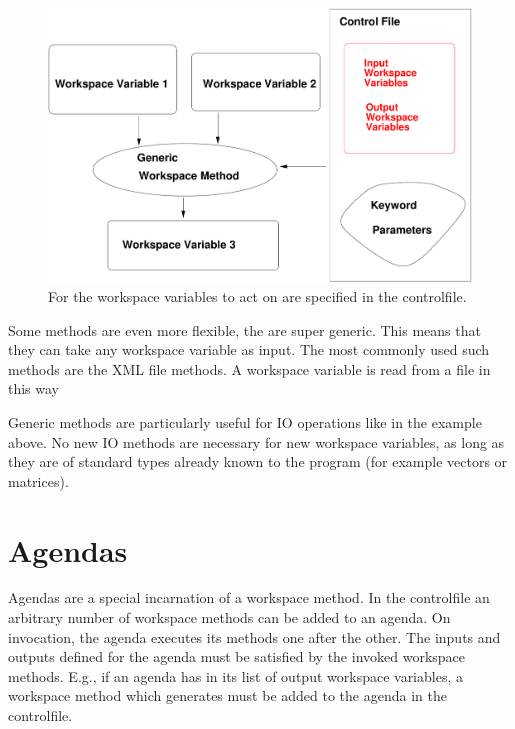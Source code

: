 \begin{figure}
  \begin{center}
    \includegraphics[width=\hsize,draft=false]{generic_method}
    \caption{For  the workspace variables to act on are
        specified in the controlfile.}
    \label{fig:generic_method}
  \end{center}
\end{figure}

Some methods are even more flexible, the are super generic. This means
that they can take any workspace variable as input. The most commonly
used such methods are the XML file methods. A workspace variable is
read from a file in this way
\begin{quote}
\end{quote}
Generic methods are particularly useful for IO operations like in the
example above. No new IO methods are necessary for new workspace
variables, as long as they are of standard types already known to the
program (for example vectors or matrices). 



\section{Agendas}
\label{sec:concept:agendas}

Agendas are a special incarnation of a workspace method. In the
controlfile an arbitrary number of workspace methods can be added to
an agenda. On invocation, the agenda executes its methods one
after the other. The inputs and outputs defined for the agenda must
be satisfied by the invoked workspace methods. E.g., if an agenda
has  in its list of output workspace variables, a
workspace method which generates  must be added to
the agenda in the controlfile.


